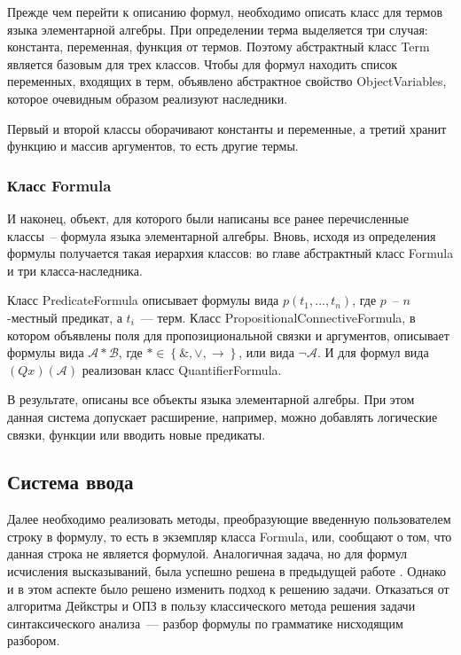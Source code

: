 Прежде чем перейти к описанию формул, необходимо описать класс для термов языка элементарной алгебры. При определении терма выделяется три случая: константа, переменная, функция от термов. Поэтому абстрактный класс Term является базовым для трех классов. Чтобы для формул находить список переменных, входящих в терм, объявлено абстрактное свойство ObjectVariables, которое очевидным образом реализуют наследники.

Первый и второй классы оборачивают константы и переменные, а третий хранит функцию и массив аргументов, то есть другие термы.

\subsubsection{Класс Formula}

И наконец, объект, для которого были написаны все ранее перечисленные классы~-- формула языка элементарной алгебры. Вновь, исходя из определения формулы получается такая иерархия классов: во главе абстрактный класс Formula и три класса-наследника.

Класс PredicateFormula описывает формулы вида $p\left(t_1, ... , t_n\right)$, где $p$~-- $n$-местный предикат, а $t_i$~--- терм. Класс PropositionalConnectiveFormula, в котором объявлены поля для пропозициональной связки и аргументов, описывает формулы вида $\mathcal{A} * \mathcal{B}$, где $* \in \left\{\&, \lor, \to\right\}$, или вида $\neg \mathcal{A}$. И для формул вида $(Qx)(\mathcal{A})$ реализован класс QuantifierFormula.

В результате, описаны все объекты языка элементарной алгебры. При этом данная система допускает расширение, например, можно добавлять логические связки, функции или вводить новые предикаты.

\subsection{Система ввода}

Далее необходимо реализовать методы, преобразующие введенную пользователем строку в формулу, то есть в экземпляр класса Formula, или, сообщают о том, что данная строка не является формулой. Аналогичная задача, но для формул исчисления высказываний, была успешно решена в предыдущей работе \cite{Gibadulin1}. Однако и в этом аспекте было решено изменить подход к решению задачи. Отказаться от алгоритма Дейкстры и ОПЗ в пользу классического метода решения задачи синтаксического анализа~--- разбор формулы по грамматике нисходящим разбором.

